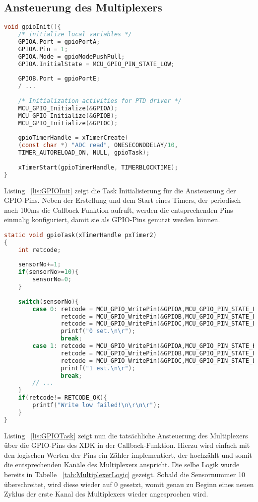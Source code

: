 \subsection{Ansteuerung des Multiplexers}\label{subsec:Ansteuerung des Multiplexers}
\begin{lstlisting}[language=C, caption={GPIO Task Initialisierung}, label=lis:GPIOInit]
void gpioInit(){
	/* initialize local variables */
	GPIOA.Port = gpioPortA;
	GPIOA.Pin = 1;
	GPIOA.Mode = gpioModePushPull;
	GPIOA.InitialState = MCU_GPIO_PIN_STATE_LOW;
	
	GPIOB.Port = gpioPortE;
	/ ...
	
	/* Initialization activities for PTD driver */
	MCU_GPIO_Initialize(&GPIOA);
	MCU_GPIO_Initialize(&GPIOB);
	MCU_GPIO_Initialize(&GPIOC);
	
	gpioTimerHandle = xTimerCreate(
	(const char *) "ADC read", ONESECONDDELAY/10,
	TIMER_AUTORELOAD_ON, NULL, gpioTask);
	
	xTimerStart(gpioTimerHandle, TIMERBLOCKTIME);
}
\end{lstlisting}
Listing ~\ref{lis:GPIOInit} zeigt die Task Initialisierung für die Ansteuerung der \acs{GPIO}-Pins. Neben der Erstellung und dem Start eines Timers, der periodisch nach 100ms die Callback-Funktion aufruft, werden die entsprechenden Pins einmalig konfiguriert, damit sie als \acs{GPIO}-Pins genutzt werden können.
\begin{lstlisting}[language=C, caption={GPIO Task}, label=lis:GPIOTask]
static void gpioTask(xTimerHandle pxTimer2)
{
	int retcode;
	
	sensorNo+=1;
	if(sensorNo>=10){
		sensorNo=0;
	}
	
	switch(sensorNo){
		case 0: retcode = MCU_GPIO_WritePin(&GPIOA,MCU_GPIO_PIN_STATE_LOW);
				retcode = MCU_GPIO_WritePin(&GPIOB,MCU_GPIO_PIN_STATE_LOW);
				retcode = MCU_GPIO_WritePin(&GPIOC,MCU_GPIO_PIN_STATE_LOW);
				printf("0 set.\n\r");
				break;
		case 1: retcode = MCU_GPIO_WritePin(&GPIOA,MCU_GPIO_PIN_STATE_HIGH);
				retcode = MCU_GPIO_WritePin(&GPIOB,MCU_GPIO_PIN_STATE_LOW);
				retcode = MCU_GPIO_WritePin(&GPIOC,MCU_GPIO_PIN_STATE_LOW);
				printf("1 est.\n\r");
				break;
		// ...
	}
	if(retcode!= RETCODE_OK){
		printf("Write low failed!\n\r\n\r");
	}
}
\end{lstlisting}
Listing ~\ref{lis:GPIOTask} zeigt nun die tatsächliche Ansteuerung des Multiplexers über die \acs{GPIO}-Pins des \acs{XDK} in der Callback-Funktion. Hierzu wird einfach mit den logischen Werten der Pins ein Zähler implementiert, der hochzählt und somit die entsprechenden Kanäle des Multiplexers anspricht. Die selbe Logik wurde bereits in Tabelle ~\ref{tab:MultiplexerLogic} gezeigt. Sobald die Sensornummer 10 überschreitet, wird diese wieder auf 0 gesetzt, womit genau zu Beginn eines neuen Zyklus der erste Kanal des Multiplexers wieder angesprochen wird.

